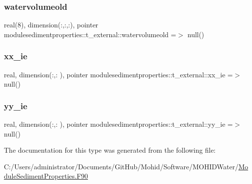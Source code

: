 \subsubsection{\texorpdfstring{watervolumeold}{watervolumeold}}
{\footnotesize\ttfamily real(8), dimension(\+:,\+:,\+:), pointer modulesedimentproperties\+::t\+\_\+external\+::watervolumeold =$>$ null()\hspace{0.3cm}{\ttfamily [private]}}

\mbox{\label{structmodulesedimentproperties_1_1t__external_ac48156ed0b3d9728e60c3c995d3fefaf}} 
\subsubsection{\texorpdfstring{xx\+\_\+ie}{xx\_ie}}
{\footnotesize\ttfamily real, dimension(\+:,\+:  ), pointer modulesedimentproperties\+::t\+\_\+external\+::xx\+\_\+ie =$>$ null()\hspace{0.3cm}{\ttfamily [private]}}

\mbox{\label{structmodulesedimentproperties_1_1t__external_a8e6f3450fdd46ddd2e1b72fd20e442a0}} 
\subsubsection{\texorpdfstring{yy\+\_\+ie}{yy\_ie}}
{\footnotesize\ttfamily real, dimension(\+:,\+:  ), pointer modulesedimentproperties\+::t\+\_\+external\+::yy\+\_\+ie =$>$ null()\hspace{0.3cm}{\ttfamily [private]}}



The documentation for this type was generated from the following file\+:\begin{DoxyCompactItemize}
\item 
C\+:/\+Users/administrator/\+Documents/\+Git\+Hub/\+Mohid/\+Software/\+M\+O\+H\+I\+D\+Water/\mbox{\hyperlink{_module_sediment_properties_8_f90}{Module\+Sediment\+Properties.\+F90}}\end{DoxyCompactItemize}
